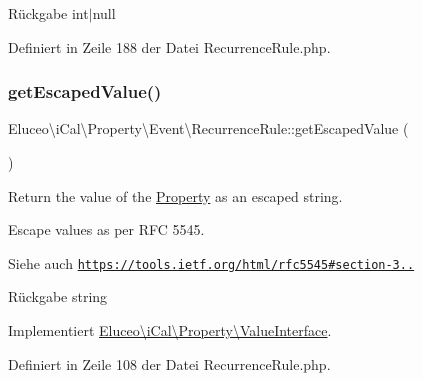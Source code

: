 \begin{DoxyReturn}{Rückgabe}
int$\vert$null 
\end{DoxyReturn}


Definiert in Zeile 188 der Datei Recurrence\+Rule.\+php.

\mbox{\label{class_eluceo_1_1i_cal_1_1_property_1_1_event_1_1_recurrence_rule_aeefc9e0958f7fbd8fc54d622c6fec793}} 
\subsubsection{\texorpdfstring{get\+Escaped\+Value()}{getEscapedValue()}\hspace{0.1cm}{\footnotesize\ttfamily [1/3]}}
{\footnotesize\ttfamily Eluceo\textbackslash{}i\+Cal\textbackslash{}\+Property\textbackslash{}\+Event\textbackslash{}\+Recurrence\+Rule\+::get\+Escaped\+Value (\begin{DoxyParamCaption}{ }\end{DoxyParamCaption})}

Return the value of the \mbox{\hyperlink{class_eluceo_1_1i_cal_1_1_property}{Property}} as an escaped string.

Escape values as per R\+FC 5545.

\begin{DoxySeeAlso}{Siehe auch}
\href{https://tools.ietf.org/html/rfc5545#section-3.3.11}{\tt https\+://tools.\+ietf.\+org/html/rfc5545\#section-\/3..}
\end{DoxySeeAlso}
\begin{DoxyReturn}{Rückgabe}
string 
\end{DoxyReturn}


Implementiert \mbox{\hyperlink{interface_eluceo_1_1i_cal_1_1_property_1_1_value_interface_a408412ae5d11fd3f239c7985aede8c32}{Eluceo\textbackslash{}i\+Cal\textbackslash{}\+Property\textbackslash{}\+Value\+Interface}}.



Definiert in Zeile 108 der Datei Recurrence\+Rule.\+php.

\mbox{\label{class_eluceo_1_1i_cal_1_1_property_1_1_event_1_1_recurrence_rule_aeefc9e0958f7fbd8fc54d622c6fec793}} 
